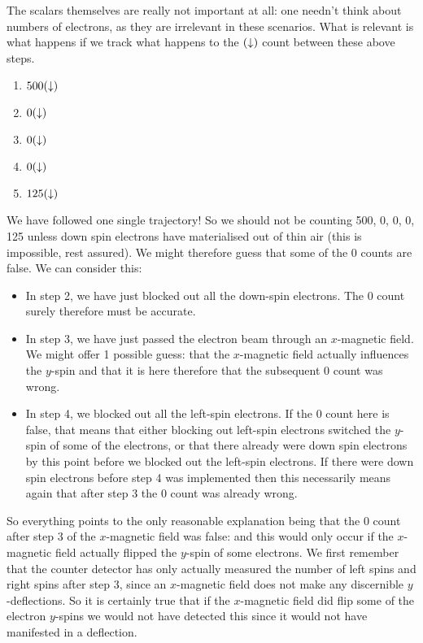 The scalars themselves are really not important at all: one needn't think about numbers of electrons, as they are irrelevant in these scenarios. What is relevant is what happens if we track what happens to the $(\downarrow)$ count between these above steps.
\begin{enumerate}
    \item $500(\downarrow)$
    \item $0(\downarrow)$
    \item $0(\downarrow)$
    \item $0(\downarrow)$
    \item $125(\downarrow)$
\end{enumerate}
We have followed one single trajectory! So we should not be counting 500, 0, 0, 0, 125 unless down spin electrons have materialised out of thin air (this is impossible, rest assured). We might therefore guess that some of the $0$ counts are false. We can consider this:
\begin{itemize}
    \item In step 2, we have just blocked out all the down-spin electrons. The 0 count surely therefore must be accurate.
    \item In step 3, we have just passed the electron beam through an $x$-magnetic field. We might offer 1 possible guess: that the $x$-magnetic field actually influences the $y$-spin and that it is here therefore that the subsequent 0 count was wrong.
    \item In step 4, we blocked out all the left-spin electrons. If the 0 count here is false, that means that either blocking out left-spin electrons switched the $y$-spin of some of the electrons, or that there already were down spin electrons by this point before we blocked out the left-spin electrons. If there were down spin electrons before step 4 was implemented then this necessarily means again that after step 3 the 0 count was already wrong.
\end{itemize}
So everything points to the only reasonable explanation being that the 0 count after step 3 of the $x$-magnetic field was false: and this would only occur if the $x$-magnetic field actually flipped the $y$-spin of some electrons. We first remember that the counter detector has only actually measured the number of left spins and right spins after step 3, since an $x$-magnetic field does not make any discernible $y$-deflections. So it is certainly true that if the $x$-magnetic field did flip some of the electron $y$-spins we would not have detected this since it would not have manifested in a deflection.
